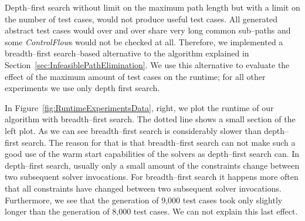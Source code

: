 \documentclass[runningheads,a4paper]{llncs}%
\newcommand{\UMLType}[1]{\textsf{\textit{#1}}} %
\begin{document}
Depth--first search without limit on the maximum path length but with a limit on
the number of test cases, would not produce useful test cases. All generated
abstract test cases would over and over share very long common sub--paths and
some \UMLType{ControlFlow}s would not be checked at all. Therefore, we
implemented a breadth--first search--based alternative to the algorithm
explained in Section~\ref{sec:InfeasiblePathElimination}. We use this
alternative to evaluate the effect of the maximum amount of test cases on the
runtime; for all other experiments we use only depth first search.

In Figure~\ref{fig:RuntimeExperimentsData}, right, we plot the runtime of our
algorithm with breadth--first search. The dotted line shows a small section of
the left plot. As we can see breadth--first search is considerably slower than
depth--first search. The reason for that is that breadth--first search can not
make such a good use of the warm start capabilities of the solvers as
depth--first search can. In depth--first search, usually only a small amount of
the constraints change between two subsequent solver invocations. For
breadth--first search it happens more often that all constraints have changed
between two subsequent solver invocations. Furthermore, we see that the
generation of 9,000 test cases took only slightly longer than the generation of
8,000 test cases. We can not explain this last effect.
%
\end{document}
